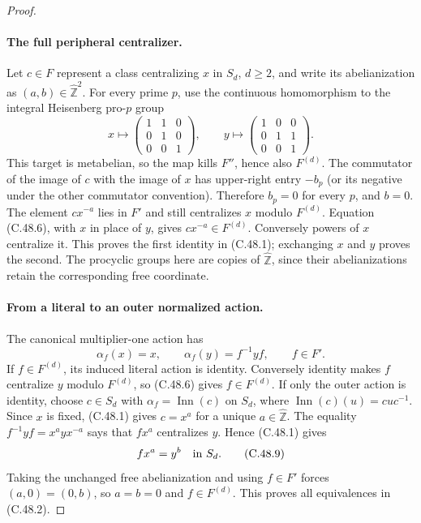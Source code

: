 \begin{proof}
\paragraph{The full peripheral centralizer.}
Let $c\in F$ represent a class centralizing $x$ in $S_d$, $d\geq2$,
and write its abelianization as $(a,b)\in\widehat{\mathbb Z}^2$.
For every prime $p$, use the continuous homomorphism to the integral
Heisenberg pro-$p$ group
\[
 x\longmapsto
 \begin{pmatrix}1&1&0\\0&1&0\\0&0&1\end{pmatrix},\qquad
 y\longmapsto
 \begin{pmatrix}1&0&0\\0&1&1\\0&0&1\end{pmatrix}.       \tag{C.48.7}
\]
This target is metabelian, so the map kills $F''$, hence also
$F^{(d)}$. The commutator of the image of $c$ with the image of
$x$ has upper-right entry $-b_p$ (or its negative under the other
commutator convention). Therefore $b_p=0$ for every $p$, and $b=0$.
The element $c x^{-a}$ lies in $F'$ and still centralizes $x$
modulo $F^{(d)}$. Equation (C.48.6), with $x$ in place of $y$,
gives $c x^{-a}\in F^{(d)}$.
Conversely powers of $x$ centralize it. This proves the first
identity in (C.48.1); exchanging $x$ and $y$ proves the second.
The procyclic groups here are copies of $\widehat{\mathbb Z}$,
since their abelianizations retain the corresponding free coordinate.

\paragraph{From a literal to an outer normalized action.}
The canonical multiplier-one action has
\[
              \alpha_f(x)=x,\qquad
              \alpha_f(y)=f^{-1}yf,
              \qquad f\in F'.                         \tag{C.48.8}
\]
If $f\in F^{(d)}$, its induced literal action is identity.
Conversely identity makes $f$ centralize $y$ modulo $F^{(d)}$,
so (C.48.6) gives $f\in F^{(d)}$.
If only the outer action is identity, choose $c\in S_d$ with
$\alpha_f=\operatorname{Inn}(c)$ on $S_d$, where
$\operatorname{Inn}(c)(u)=cuc^{-1}$.
Since $x$ is fixed, (C.48.1) gives $c=x^a$ for a unique
$a\in\widehat{\mathbb Z}$.
The equality $f^{-1}yf=x^a yx^{-a}$ says that $f x^a$
centralizes $y$. Hence (C.48.1) gives
\[
                        f x^a=y^b\quad\hbox{in }S_d.  \tag{C.48.9}
\]
Taking the unchanged free abelianization and using $f\in F'$
forces $(a,0)=(0,b)$, so $a=b=0$ and $f\in F^{(d)}$.
This proves all equivalences in (C.48.2).


\end{proof}
